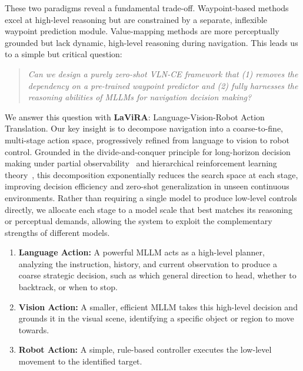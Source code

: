 \documentclass[letterpaper, 10 pt, conference]{ieeeconf}
\begin{document}
These two paradigms reveal a fundamental trade-off. Waypoint-based methods excel at high-level reasoning but are constrained by a separate, inflexible waypoint prediction module. Value-mapping methods are more perceptually grounded but lack dynamic, high-level reasoning during navigation. This leads us to a simple but critical question:

\begin{quote}
    \textit{
    Can we design a purely zero-shot VLN-CE framework that (1) removes the dependency on a pre-trained waypoint predictor and (2) fully harnesses the reasoning abilities of MLLMs for navigation decision making?
    }
\end{quote}

We answer this question with \textbf{LaViRA}: Language-Vision-Robot Action Translation.
Our key insight is to decompose navigation into a coarse-to-fine, multi-stage action space, progressively refined from language to vision to robot control. Grounded in the divide-and-conquer principle for long-horizon decision making under partial observability~\cite{bellman1966dynamic} and hierarchical reinforcement learning theory~\cite{sutton1999between}, this decomposition exponentially reduces the search space at each stage, improving decision efficiency and zero-shot generalization in unseen continuous environments. Rather than requiring a single model to produce low-level controls directly, we allocate each stage to a model scale that best matches its reasoning or perceptual demands, allowing the system to exploit the complementary strengths of different models.

\begin{enumerate}
    \item \textbf{Language Action:} A powerful MLLM acts as a high-level planner, analyzing the instruction, history, and current observation to produce a coarse strategic decision, such as which general direction to head, whether to backtrack, or when to stop.
    \item \textbf{Vision Action:} A smaller, efficient MLLM takes this high-level decision and grounds it in the visual scene, identifying a specific object or region to move towards.
    \item \textbf{Robot Action:} A simple, rule-based controller executes the low-level movement to the identified target.
\end{enumerate}

\end{document}
